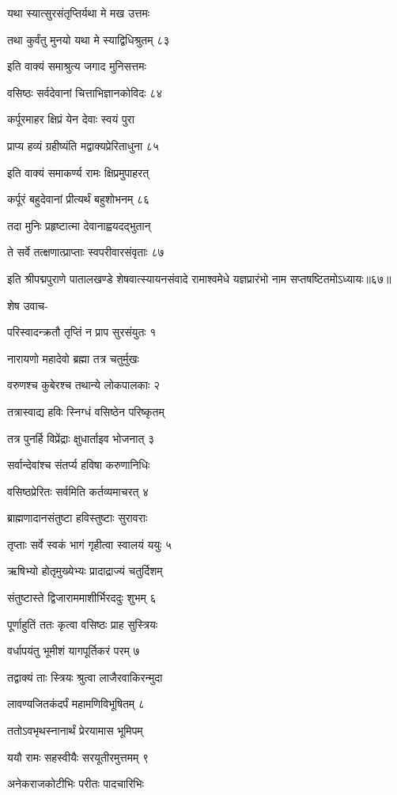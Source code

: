 यथा स्यात्सुरसंतृप्तिर्यथा मे मख उत्तमः

तथा कुर्वंतु मुनयो यथा मे स्याद्विधिश्रुतम् ८३

इति वाक्यं समाश्रुत्य जगाद मुनिसत्तमः

वसिष्ठः सर्वदेवानां चित्ताभिज्ञानकोविदः ८४

कर्पूरमाहर क्षिप्रं येन देवाः स्वयं पुरा

प्राप्य हव्यं ग्रहीष्यंति मद्वाक्यप्रेरिताधुना ८५

इति वाक्यं समाकर्ण्य रामः क्षिप्रमुपाहरत्

कर्पूरं बहुदेवानां प्रीत्यर्थं बहुशोभनम् ८६

तदा मुनिः प्रहृष्टात्मा देवानाह्वयदद्भुतान्

ते सर्वे तत्क्षणात्प्राप्ताः स्वपरीवारसंवृताः ८७

इति श्रीपद्मपुराणे पातालखण्डे शेषवात्स्यायनसंवादे रामाश्वमेधे यज्ञप्रारंभो नाम सप्तषष्टितमोऽध्यायः॥६७॥


शेष उवाच-

परिस्वादन्क्रतौ तृप्तिं न प्राप सुरसंयुतः १

नारायणो महादेवो ब्रह्मा तत्र चतुर्मुखः

वरुणश्च कुबेरश्च तथान्ये लोकपालकाः २

तत्रास्वाद्य हविः स्निग्धं वसिष्ठेन परिष्कृतम्

तत्र पुनर्हि विप्रेंद्राः क्षुधार्ताइव भोजनात् ३

सर्वान्देवांश्च संतर्प्य हविषा करुणानिधिः

वसिष्ठप्रेरितः सर्वमिति कर्तव्यमाचरत् ४

ब्राह्मणादानसंतुष्टा हविस्तुष्टाः सुरावराः

तृप्ताः सर्वे स्वकं भागं गृहीत्वा स्वालयं ययुः ५

ऋषिभ्यो होतृमुख्येभ्यः प्रादाद्राज्यं चतुर्दिशम्

संतुष्टास्ते द्विजाराममाशीर्भिरददुः शुभम् ६

पूर्णाहुतिं ततः कृत्वा वसिष्ठः प्राह सुस्त्रियः

वर्धापयंतु भूमीशं यागपूर्तिकरं परम् ७

तद्वाक्यं ताः स्त्रियः श्रुत्वा लाजैरवाकिरन्मुदा

लावण्यजितकंदर्पं महामणिविभूषितम् ८

ततोऽवभृथस्नानार्थं प्रेरयामास भूमिपम्

ययौ रामः सहस्वीयैः सरयूतीरमुत्तमम् ९

अनेकराजकोटीभिः परीतः पादचारिभिः

